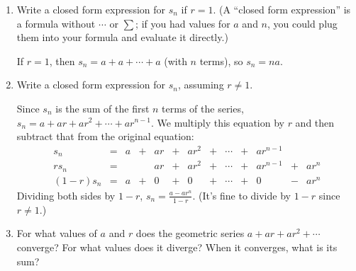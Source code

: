 \documentclass[main]{subfiles}
\begin{document}
\begin{enumerate}[resume]
\begin{enumerate}
    \item
    \begin{problem}[0.75in]
    Write a closed form expression for $s_n$ if $r = 1$.  (A ``closed
    form expression'' is a formula without $\cdots$ or $\sum$; if you had
    values for $a$ and $n$, you could plug them into your formula 
    and evaluate it directly.)
    \end{problem}

    \begin{solution}
    If $r = 1$, then $s_n = a + a + \cdots + a$ (with $n$ terms), so
    $s_n = na$. 
    \end{solution}
    
    \item
    \begin{problem}[2.5in]
    Write a closed form expression for $s_n$, assuming $r \neq 1$.
    \end{problem}

    \begin{solution}
    Since $s_n$ is the sum of the first $n$ terms of the series, $s_n =
    a + ar + ar^2 + \cdots + ar^{n-1}$.  We multiply this equation by
    $r$ and then subtract that from the original equation:
    \[ \begin{array}{rcrcrcrcccrcr}
    s_n & = & a & + & ar & + & ar^2 & + & \cdots & + & ar^{n-1}
    \\
    r s_n & = & & & ar & + & ar^2 & + & \cdots & + &
    ar^{n-1} & + & ar^n \\
    \hline 
    (1 - r) s_n & = & a & + & 0 & + & 0 & + & \cdots & + & 0 & - & a
    r^n 
    \end{array}\]
    Dividing both sides by $1 - r$, $s_n = \boxed{\frac{a - ar^n}{1 -
    r}}$.  (It's fine to divide by $1 - r$ since $r \neq 1$.)
    \end{solution}

    \item
    \begin{problem}[3in]
    For what values of $a$ and $r$ does the geometric series $a + ar +
    ar^2 + \cdots$ converge?  For what values does it diverge?  When it
    converges, what is its sum?

    \end{problem}


\end{enumerate}
\end{enumerate}
\end{document}
